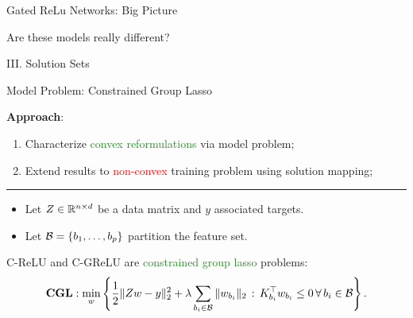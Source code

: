 \documentclass[usenames,dvipsnames,mathserif,notheorems]{beamer}
\newcommand{\horizontalrule}{
	{
			\vspace{-0.5em}
			\center \rule{\textwidth}{0.1em}
			\vspace{-0.2em}
		}
}
\newcommand{\red}[1]{\textcolor{Red}{#1}}
\newcommand{\green}[1]{\textcolor{ForestGreen}{#1}}
\begin{document}
\begin{frame}{Gated ReLu Networks: Big Picture}
	\begin{center}
		\Large Are these models really different?
	\end{center}

	\pause

	\begin{figure}[]
		\centering
		
	\end{figure}
\end{frame}


\begin{frame}{}
	\begin{center}
		\huge III. Solution Sets
	\end{center}
\end{frame}

\begin{frame}{Model Problem: Constrained Group Lasso}

	{
		\large
		\textbf{Approach}:
		\begin{enumerate}
			\large
			\item \pause
			      Characterize \green{convex reformulations} via model problem;
			      \vspace{1ex}
			\item \pause
			      Extend results to \red{non-convex} training problem
			      using solution mapping;
		\end{enumerate}
	}

	\pause
	\horizontalrule

	\begin{itemize}
		\item Let \( Z \in \mathbb{R}^{n \times d} \) be a data matrix and \( y \) associated targets.
		      \pause
		\item Let \( \mathcal{B} = \left\{b_1, \ldots, b_p\right\} \) partition the
		      feature set.
		      \pause
	\end{itemize}

	\vspace{2ex}

	C-ReLU and C-GReLU are \green{constrained group lasso} problems:
	\vspace{-1ex}
	\begin{equation*}
		\textbf{CGL}: \min_{w}
		\left\{ \frac 1 2 \|Z w - y\|_2^2
			+ \lambda \sum_{{b_i} \in \mathcal{B}} \|w_{b_i}\|_2
			\, : \, K_{{b_i}}^\top w_{b_i} \leq 0 \, \forall \, {b_i} \in \mathcal{B}\right\}.
	\end{equation*}

\end{frame}
\end{document}
